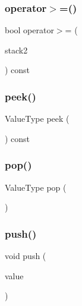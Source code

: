 \mbox{\label{classStack_ad2ffb92607a0ad29b040677a695ccea8}} 
\subsubsection{\texorpdfstring{operator$>$=()}{operator>=()}}
{\footnotesize\ttfamily bool operator$>$= (\begin{DoxyParamCaption}\item[{const \mbox{\hyperlink{classStack}{Stack}}$<$ Value\+Type $>$ \&}]{stack2 }\end{DoxyParamCaption}) const}

\mbox{\label{classStack_a7fcf31135d35acfa8ab1174c44bf28f3}} 
\subsubsection{\texorpdfstring{peek()}{peek()}}
{\footnotesize\ttfamily Value\+Type peek (\begin{DoxyParamCaption}{ }\end{DoxyParamCaption}) const}

\mbox{\label{classStack_a278630d7ff14886cdbc3585527e91733}} 
\subsubsection{\texorpdfstring{pop()}{pop()}}
{\footnotesize\ttfamily Value\+Type pop (\begin{DoxyParamCaption}{ }\end{DoxyParamCaption})}

\mbox{\label{classStack_a3fa54a00594a4b33b29b45c98c9f6ed4}} 
\subsubsection{\texorpdfstring{push()}{push()}}
{\footnotesize\ttfamily void push (\begin{DoxyParamCaption}\item[{const Value\+Type \&}]{value }\end{DoxyParamCaption})}

